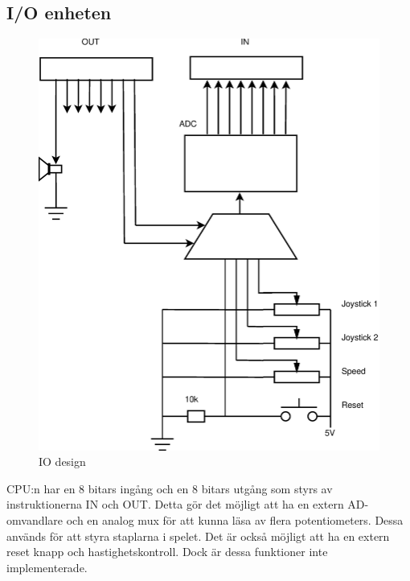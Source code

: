 \subsection{I/O enheten}
	\begin{center}
		\begin{figure}[H]
    	\centering
			\includegraphics[scale=0.40]{../grafik/io.eps}
			\caption{IO design}
			\label{fig:joy}
		\end{figure}
	\end{center}
CPU:n har en 8 bitars ingång och en 8 bitars utgång som styrs av instruktionerna IN och OUT. Detta gör det möjligt att ha en extern AD-omvandlare och en analog mux för att kunna läsa av flera potentiometers. Dessa används för att styra staplarna i spelet.
Det är också möjligt att ha en extern reset knapp och hastighetskontroll. Dock är dessa funktioner inte implementerade.

